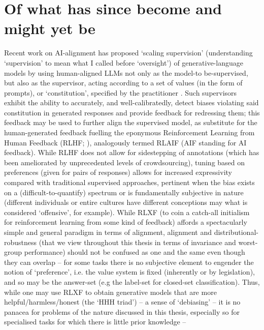 \section*{Of what has since become and might yet be}
%
%
Recent work on AI-alignment has proposed `scaling supervision' (understanding `supervision' to mean
what I called before `oversight') of generative-language models by using human-aligned LLMs not
only as the model-to be-supervised, but also as the supervisor, acting according to a set of values
(in the form of prompts), or `constitution', specified by the practitioner
\citep{bowman2022measuring, bai2022constitutional}.
%
Such supervisors exhibit the ability to accurately, and well-calibratedly, detect biases violating
said constitution in generated responses and provide feedback for redressing them; this feedback
may be used to further align the supervised model, as substitute for the human-generated feedback
fuelling the eponymous Reinforcement Learning from Human Feedback (RLHF; \cite{christiano2017deep,
stiennon2020learning, bai2022training}), analogously termed RLAIF (AIF standing for AI feedback).
%
While RLHF does not allow for sidestepping of annotations (which has been ameliorated by
unprecedented levels of crowdsourcing), tuning based on preferences (given for pairs of responses)
allows for increased expressivity compared with traditional supervised approaches, pertinent when
the bias exists on a (difficult-to-quantify) spectrum or is fundamentally subjective in nature
(different individuals or entire cultures have different conceptions may what is considered
`offensive', for example).
%
While RLXF (to coin a catch-all initialism for reinforcement learning from some kind of feedback)
affords a spectacularly simple and general paradigm in terms of alignment, alignment and
distributional-robustness (that we view throughout this thesis in terms of invariance and
worst-group performance) should not be confused as one and the same even though they can overlap --
for some tasks there is no subjective element to engender the notion of `preference', i.e. the
value system is fixed (inherently or by legislation), and so may be the answer-set (e.g the
label-set for closed-set classification). 
%
Thus, while one may use RLXF to obtain generative models that are more helpful/harmless/honest (the
`HHH triad') -- a sense of `debiasing' -- it is no panacea for problems of the nature discussed in
this thesis, especially so for specialised tasks for which there is little prior knowledge --
